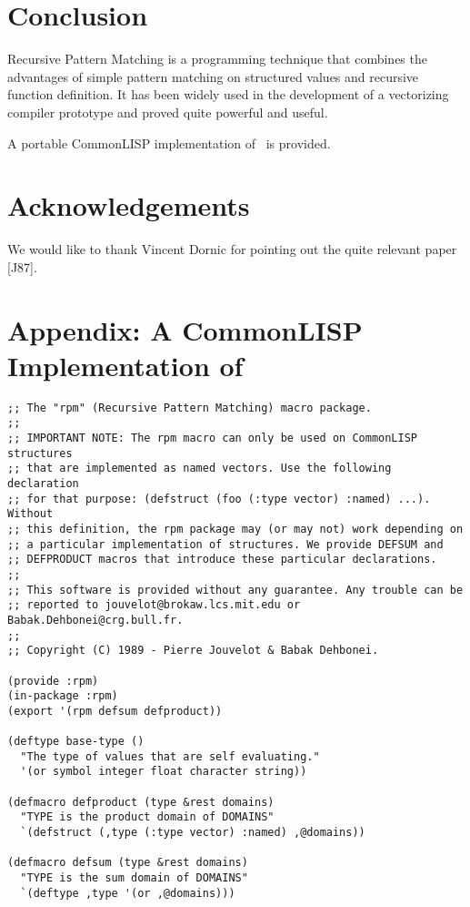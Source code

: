 \begin{sloppypar}
\section{Conclusion}

Recursive Pattern Matching is a programming technique that combines
the advantages of simple pattern matching on structured values and
recursive function definition. It has been widely used in the
development of a vectorizing compiler prototype and proved quite
powerful and useful. 

A portable CommonLISP implementation of \rpm\ is provided. 

\section*{Acknowledgements}

We would like to thank Vincent Dornic for pointing out the quite
relevant paper [J87].

\newpage
\section*{Appendix: A CommonLISP Implementation of \rpm}

\begin{verbatim}
;; The "rpm" (Recursive Pattern Matching) macro package.
;;
;; IMPORTANT NOTE: The rpm macro can only be used on CommonLISP structures
;; that are implemented as named vectors. Use the following declaration
;; for that purpose: (defstruct (foo (:type vector) :named) ...). Without
;; this definition, the rpm package may (or may not) work depending on
;; a particular implementation of structures. We provide DEFSUM and
;; DEFPRODUCT macros that introduce these particular declarations.
;; 
;; This software is provided without any guarantee. Any trouble can be
;; reported to jouvelot@brokaw.lcs.mit.edu or Babak.Dehbonei@crg.bull.fr.
;;
;; Copyright (C) 1989 - Pierre Jouvelot & Babak Dehbonei.

(provide :rpm)
(in-package :rpm)
(export '(rpm defsum defproduct))

(deftype base-type ()
  "The type of values that are self evaluating."
  '(or symbol integer float character string))

(defmacro defproduct (type &rest domains)
  "TYPE is the product domain of DOMAINS"
  `(defstruct (,type (:type vector) :named) ,@domains))

(defmacro defsum (type &rest domains)
  "TYPE is the sum domain of DOMAINS"
  `(deftype ,type '(or ,@domains)))


\end{verbatim}
\end{sloppypar}
